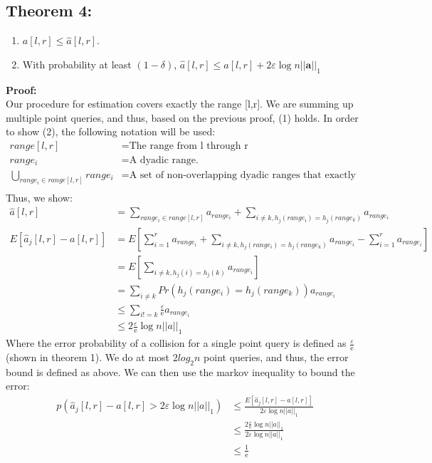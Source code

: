 \documentclass[11pt]{article}
\begin{document}
\subsection{Theorem 4: }
\begin{enumerate}[label=\textnormal{(\arabic*)}]
    \item $a[l,r] \leq \hat a[l,r]$.\\
    \item With probability at least $(1-\delta)$, $\hat a[l,r] \leq a[l,r] + 2\varepsilon \log n ||\bm{a}||_1$
\end{enumerate}
    \textbf{Proof:}\\
Our procedure for estimation covers exactly the range [l,r]. We are summing up multiple point queries, and thus, based on the previous proof, (1) holds. In order to show (2), the following notation will be used:
\begin{align*}
    range[l,r] &= \text{The range from l through r}\\
    range_i &= \text{A dyadic range.}\\
    \bigcup_{range_i \in range[l,r]} range_i &= \text{A set of non-overlapping dyadic ranges that exactly cover range[l,r]}\\
\end{align*}
Thus, we show:
\begin{align*}
    \hat a[l,r] &= \sum_{range_i \in range[l,r]} a_{range_i} + \sum_{i \neq k, h_j(range_i) = h_j(range_k)} a_{range_i}\\
    E[\hat a_j[l,r] - a[l,r]] &= E[\sum_{i=1}^r a_{range_i} + \sum_{i \neq k, h_j(range_i)=h_j(range_k)} a_{range_i} - \sum_{i=1}^r a_{range_i}]\\
    &= E[\sum_{i \neq k, h_j(i)=h_j(k)} a_{range_i}]\\
    &= \sum_{i \neq k}Pr(h_j(range_i) = h_j(range_k)) a_{range_i}\\
    &\leq \sum_{i!=k} \frac{\varepsilon}{\mathrm e} a_{range_i}\\
    &\leq 2\frac{\varepsilon}{\mathrm e} \log n ||a||_1
\end{align*}
Where the error probability of a collision for a single point query is defined as $\frac{\varepsilon}{\mathrm e}$ (shown in theorem 1). We do at most $2log_2n$ point queries, and thus, the error bound is defined as above. We can then use the markov inequality to bound the error:
\begin{align*}
    p(\hat a_j[l,r] - a[l,r] > 2\varepsilon \log n ||a||_1) &\leq \frac{E[\hat a_j[l,r] - a[l,r]]}{2\varepsilon \log n||a||_1}\\
    &\leq \frac{2\frac{\varepsilon}{\mathrm e}\log n ||a||_1}{2\varepsilon \log n ||a||_1}\\
    &\leq \frac{1}{\mathrm e}
\end{align*}
\end{document}
